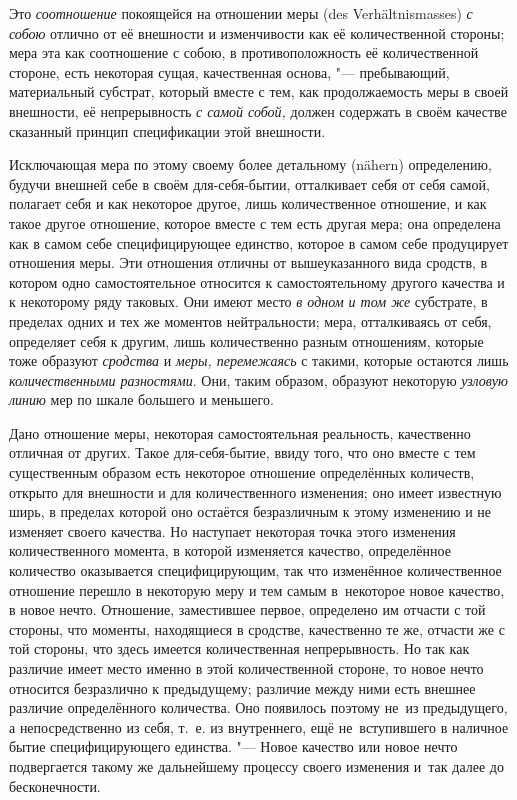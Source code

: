 Это {\em соотношение} покоящейся на отношении меры (des Ver\-hält\-nis\-masses)
{\em с собою} отлично от её внешности и изменчивости как её количественной
стороны; мера эта как соотношение с собою, в противоположность её
количественной стороне, есть некоторая сущая, качественная основа, "---
пребывающий, материальный субстрат, который вместе с тем, как продолжаемость
меры в своей внешности, её непрерывность {\em с самой собой,} должен содержать
в своём качестве сказанный принцип спецификации этой внешности.

Исключающая мера по этому своему более детальному (nähern) определению, будучи
внешней себе в своём для-себя-бытии, отталкивает себя от себя самой, полагает
себя и как некоторое другое, лишь количественное отношение, и как такое другое
отношение, которое вместе с тем есть другая мера; она определена как в самом
себе специфицирующее единство, которое в самом себе продуцирует отношения меры.
Эти отношения отличны от вышеуказанного вида сродств, в котором одно
самостоятельное относится к самостоятельному другого качества и к некоторому
ряду таковых. Они имеют место {\em в одном и том же} субстрате, в пределах
одних и тех же моментов нейтральности; мера, отталкиваясь от себя, определяет
себя к другим, лишь количественно разным отношениям, которые тоже образуют
{\em сродства} и {\em меры, перемежаясь} с такими, которые остаются лишь
{\em количественными разностями}. Они, таким образом, образуют некоторую
{\em узловую линию} мер по шкале большего и меньшего.

Дано отношение меры, некоторая самостоятельная реальность, качественно отличная
от других. Такое для-себя-бытие, ввиду того, что оно вместе с тем существенным
образом есть некоторое отношение определённых количеств, открыто для внешности
и для количественного изменения; оно имеет известную ширь, в пределах которой
оно остаётся безразличным к этому изменению и не изменяет своего качества. Но
наступает некоторая точка этого изменения количественного момента, в которой
изменяется качество, определённое количество оказывается специфицирующим, так
что изменённое количественное отношение перешло в некоторую меру и тем самым
в~некоторое новое качество, в новое нечто. Отношение, заместившее первое,
определено им отчасти с той стороны, что моменты, находящиеся в сродстве,
качественно те же, отчасти же с той стороны, что здесь имеется количественная
непрерывность. Но так как различие имеет место именно в этой количественной
стороне, то новое нечто относится безразлично к предыдущему; различие между
ними есть внешнее различие определённого количества. Оно появилось поэтому
не~из предыдущего, а непосредственно из себя, т.~е. из внутреннего, ещё
не~вступившего в наличное бытие специфицирующего единства. "--- Новое качество
или новое нечто подвергается такому же дальнейшему процессу своего изменения
и~так далее до бесконечности.


